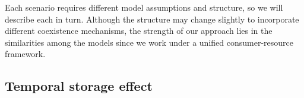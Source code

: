\documentclass[12pt]{article}
\begin{document}
Each scenario requires different model assumptions and structure, so we will describe each in turn. Although the structure may change slightly to incorporate different coexistence mechanisms, the strength of our approach lies in the similarities among the models since we work under a unified consumer-resource framework.

\subsection{Temporal storage effect}
\end{document}

